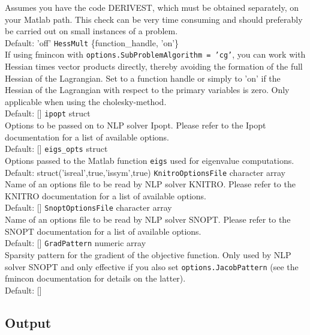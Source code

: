 \documentclass{article}
\begin{document}
Assumes you have the code DERIVEST, which must be obtained separately, on your Matlab path. 
This check can be very time consuming and should preferably be carried out on small instances of 
a problem.\\
Default: 'off'
\vskip 2mm
\noindent
\texttt{HessMult} \hskip 2cm   \{function\_handle, 'on'\} \\
If using fmincon with \texttt{options.SubProblemAlgorithm = 'cg'}, you can work with Hessian 
times vector products directly, thereby avoiding the formation of the full Hessian of
the Lagrangian. Set to a function handle or simply to 'on' if the Hessian of
the Lagrangian with respect to the primary variables is zero. Only applicable when using the cholesky-method. \\
Default: []
\vskip 2mm
\noindent
\texttt{ipopt} \hskip 2.7cm     struct   \\
Options to be passed on to NLP solver Ipopt. Please refer to the Ipopt documentation for a
list of available options. \\
Default: []
\vskip 2mm
\noindent
\texttt{eigs\_opts} \hskip 2.1cm       struct    \\
Options passed to the Matlab function \texttt{eigs} used for eigenvalue computations. \\
Default: struct('isreal',true,'issym',true)
\vskip 2mm
\noindent
\texttt{KnitroOptionsFile} \hskip 0.5cm  character array \\
Name of an options file to be read by NLP solver KNITRO. Please refer to the KNITRO
documentation for a list of available options.\\
Default: []
\vskip 2mm
\noindent
\texttt{SnoptOptionsFile} \hskip 0.6cm   character array \\
Name of an options file to be read by NLP solver SNOPT. Please refer to the SNOPT
documentation for a list of available options.\\
Default: []
\vskip 2mm
\noindent
\texttt{GradPattern} \hskip 1.5cm        numeric array   \\
Sparsity pattern for the gradient of the objective function. Only used by NLP solver SNOPT and 
only effective if you also set \texttt{options.JacobPattern} (see the fmincon documentation for
details on the latter). \\
Default: []



\subsection{Output}
\end{document}
